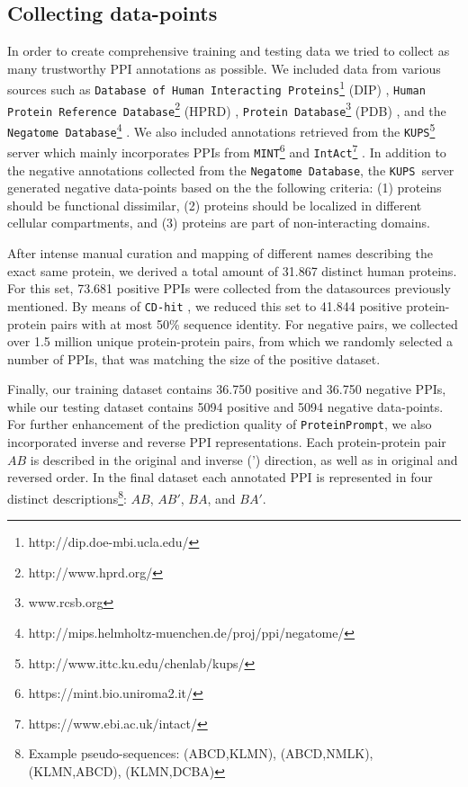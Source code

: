 \documentclass[preprint,3p,times,twocolumn]{elsarticle}
\newcommand{\nega}{\texttt{Negatome Database}}
\newcommand{\kups}{\texttt{KUPS}}
\newcommand{\toolblank}{\texttt{ProteinPrompt}}
\newcommand{\tool}{\toolblank\hspace{2pt}}
\begin{document}
\subsection{Collecting data-points}
In order to create comprehensive training and testing data we tried to
collect as many trustworthy PPI annotations as possible. We included
data from various sources such as \texttt{Database of Human
  Interacting Proteins}\footnote{http://dip.doe-mbi.ucla.edu/} (DIP)
\cite{Salwinski:2004}, \texttt{Human Protein Reference
  Database}\footnote{http://www.hprd.org/} (HPRD)
\cite{Keshava_Prasad:2009}, \texttt{Protein
  Database}\footnote{www.rcsb.org} (PDB) \cite{Berman:2000}, and the
\nega\footnote{http://mips.helmholtz-muenchen.de/proj/ppi/negatome/}
\cite{Blohm:2014}. We also included annotations retrieved from the
\kups \footnote{http://www.ittc.ku.edu/chenlab/kups/}   server
\cite{Chen:2011} which mainly incorporates PPIs from
\texttt{MINT}\footnote{https://mint.bio.uniroma2.it/}
\cite{Licata:2012} and
\texttt{IntAct}\footnote{https://www.ebi.ac.uk/intact/}
\cite{Orchard:2014}. In addition to the negative annotations collected
from the \nega, the \kups\ server generated negative data-points based
on the the following criteria: (1) proteins should be functional
dissimilar, (2) proteins should be localized in different cellular
compartments, and (3) proteins are part of non-interacting domains. 

After intense manual curation and mapping of different names describing
the exact same protein, we derived a total amount of 31.867 distinct
human proteins. For this set, 73.681 positive PPIs were collected
from the datasources previously mentioned. By means of \texttt{CD-hit}
\cite{Li:2006, Fu:2012}, we reduced this set to 41.844 positive
protein-protein pairs with at most 50\% sequence identity. For
negative pairs, we collected over 1.5 million unique protein-protein
pairs, from which we randomly selected a number of PPIs, that was
matching the size of the positive dataset.

Finally, our training dataset contains 36.750 positive and 36.750
negative PPIs, while our testing dataset contains 5094 positive and
5094 negative data-points. For further enhancement of the prediction
quality of \tool, we also incorporated inverse and reverse PPI
representations. Each protein-protein pair $AB$ is described in the
original and inverse (') direction, as well as in original and
reversed order. In the final dataset each annotated PPI is represented
in four distinct descriptions\footnote{Example pseudo-sequences: (ABCD,KLMN),
  (ABCD,NMLK), (KLMN,ABCD), (KLMN,DCBA)}: $AB$, $AB'$, $BA$, and
$BA'$. 
\end{document}
